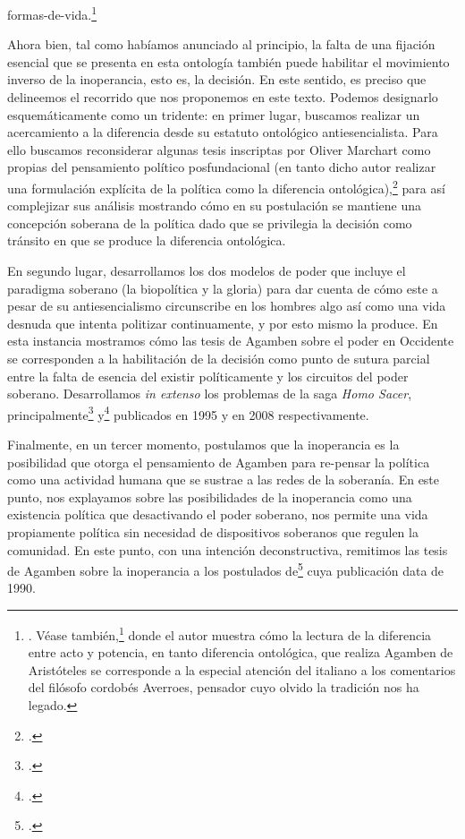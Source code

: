 formas-de-vida.\footnote{\cite[18 y ss.]{@7091-AGAMBEN2001}. Véase también,\footcite{@7092-KARMYBOLTON2010} donde el autor muestra cómo la lectura de la diferencia entre acto y potencia, en tanto diferencia ontológica, que realiza Agamben de Aristóteles se corresponde a la especial atención del italiano a los comentarios del filósofo cordobés Averroes, pensador cuyo olvido la tradición nos ha legado.}

Ahora bien, tal como habíamos anunciado al principio, la falta de una fijación esencial que se presenta en esta ontología también puede habilitar el movimiento inverso de la inoperancia, esto es, la decisión. En este sentido, es preciso que delineemos el recorrido que nos proponemos en este texto. Podemos designarlo esquemáticamente como un tridente: en primer lugar, buscamos realizar un acercamiento a la diferencia desde su estatuto ontológico antiesencialista. Para ello buscamos reconsiderar algunas tesis inscriptas por Oliver Marchart como propias del pensamiento político posfundacional (en tanto dicho autor realizar una formulación explícita de la política como la diferencia ontológica),\footcite{@7093-MARCHART2009} para así complejizar sus análisis mostrando cómo en su postulación se mantiene una concepción soberana de la política dado que se privilegia la decisión como tránsito en que se produce la diferencia ontológica.

En segundo lugar, desarrollamos los dos modelos de poder que incluye el paradigma soberano (la biopolítica y la gloria) para dar cuenta de cómo este a pesar de su antiesencialismo circunscribe en los hombres algo así como una vida desnuda que intenta politizar continuamente, y por esto mismo la produce. En esta instancia mostramos cómo las tesis de Agamben sobre el poder en Occidente se corresponden a la habilitación de la decisión como punto de sutura parcial entre la falta de esencia del existir políticamente y los circuitos del poder soberano. Desarrollamos \emph{in extenso} los problemas de la saga \emph{Homo Sacer}, principalmente\footcite{@7101-AGAMBEN2003} y\footcite{@7102-AGAMBEN2008} publicados en 1995 y en 2008 respectivamente.

Finalmente, en un tercer momento, postulamos que la inoperancia es la posibilidad que otorga el pensamiento de Agamben para re-pensar la política como una actividad humana que se sustrae a las redes de la soberanía. En este punto, nos explayamos sobre las posibilidades de la inoperancia como una existencia política que desactivando el poder soberano, nos permite una vida propiamente política sin necesidad de dispositivos soberanos que regulen la comunidad. En este punto, con una intención deconstructiva, remitimos las tesis de Agamben sobre la inoperancia a los postulados de\footcite{@7094-AGAMBEN2003} cuya publicación data de 1990.

